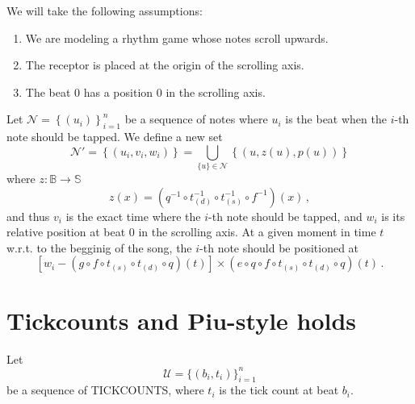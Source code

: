 \documentclass[a4paper,9pt]{article}
\begin{document}
    We will take the following assumptions:
    \begin{enumerate}
	    \item We are modeling a rhythm game whose notes scroll upwards.
	    \item The receptor is placed at the origin of the scrolling axis.
	    \item The beat 0 has a position 0 in the scrolling axis.
    \end{enumerate}

    Let $ \mathcal{N} =  \left\{ \left( u_{i} \right) \right\}_{i=1}^{n} $ be a sequence of notes where $ u_{i} $ is the beat when the $ i $-th note should be tapped. We define a new set 
    \begin{equation}
	    \mathcal{N'} = \left\{ \left( u_{i}, v_i, w_i \right) \right\} = \bigcup_{\{u\}\in \mathcal{N}} \left\{ \left(u, z(u), p(u) \right) \right\}
	    \label{eq:set}
    \end{equation}
    where $ z: \mathbb{B}\rightarrow \mathbb{S} $
    \begin{equation}
	    z(x) = \left( q^{-1}\circ t_{(d)}^{-1}\circ t_{(s)}^{-1}\circ f^{-1}\right)(x)\,,
	    \label{eq:final-g}
    \end{equation}
    and thus $ v_i $ is the exact time where the $ i $-th note should be tapped, and $ w_i $ is its relative position at beat 0 in the scrolling axis.
    At a given moment in time $ t $ w.r.t. to the begginig of the song, the $ i $-th note should be positioned at
    \begin{equation}
	    \left[ w_i - \left(g\circ f\circ t_{(s)}\circ t_{(d)}\circ q \right)(t) \right] \times \left( e\circ q\circ f\circ t_{(s)}\circ t_{(d)}\circ q \right)(t)\,.
	    \label{eq:final-position}
    \end{equation}

\appendix

\section{Tickcounts and Piu-style holds}

Let 
\begin{equation}
	\mathcal{U} = \{(b_{i},t_{i})\}_{i=1}^{n}	
\end{equation}
be a sequence of TICKCOUNTS, where $ t_{i} $ is the tick count at beat $ b_{i} $. 
\end{document}
